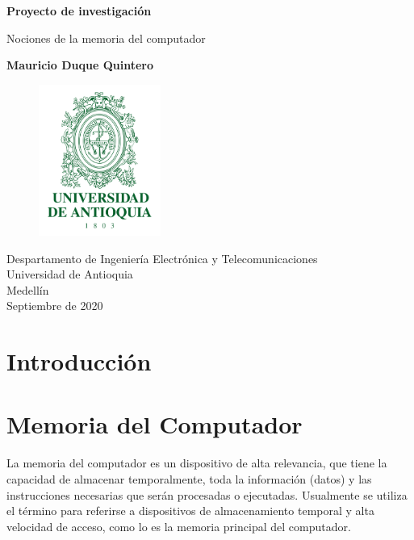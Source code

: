 \documentclass{article}
\begin{document}
\begin{titlepage}
    \begin{center}
        \vspace*{1cm}
            
        \Huge
        \textbf{Proyecto de investigación }
            
        \vspace{0.5cm}
        \LARGE
        Nociones de la memoria del computador
            
        \vspace{2.5cm}
            
        \textbf{Mauricio Duque Quintero }
            
        \vfill
        \begin{figure}[h]
        \includegraphics[width=4cm]{Escudo-UdeA.png}
        \centering
        \label{fig:descarga}
        \end{figure}
     
        \vspace{0.8cm}
            
        \Large
        Despartamento de Ingeniería Electrónica y Telecomunicaciones\\
        Universidad de Antioquia\\
        Medellín\\
        Septiembre de 2020
            
    \end{center}
\end{titlepage}

\tableofcontents

\section{Introducción}

\section{Memoria del Computador}
	La memoria del computador es un dispositivo de alta relevancia, que tiene la capacidad de almacenar temporalmente, toda la información (datos)  y  las instrucciones necesarias que serán procesadas o ejecutadas. Usualmente se utiliza el término para referirse a dispositivos de almacenamiento temporal y alta velocidad de acceso, como lo es la memoria principal del computador.\cite{ecuredwebsite}
\end{document}
